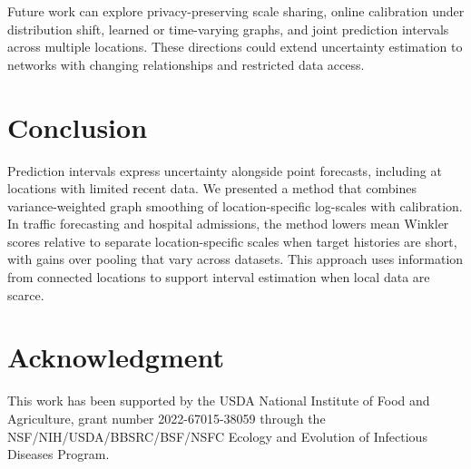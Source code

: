 \documentclass[conference]{IEEEtran}
\begin{document}
Future work can explore privacy-preserving scale sharing, online calibration under distribution shift, learned or time-varying graphs, and joint prediction intervals across multiple locations. These directions could extend uncertainty estimation to networks with changing relationships and restricted data access.

\section{Conclusion}
\label{sec:conclusion}

Prediction intervals express uncertainty alongside point forecasts, including at locations with limited recent data. We presented a method that combines variance-weighted graph smoothing of location-specific log-scales with calibration. In traffic forecasting and hospital admissions, the method lowers mean Winkler scores relative to separate location-specific scales when target histories are short, with gains over pooling that vary across datasets. This approach uses information from connected locations to support interval estimation when local data are scarce.

\section*{Acknowledgment}

This work has been supported by the USDA National Institute of Food and Agriculture, grant number 2022-67015-38059 through the NSF/NIH/USDA/BBSRC/BSF/NSFC Ecology and Evolution of Infectious Diseases Program.



\end{document}
